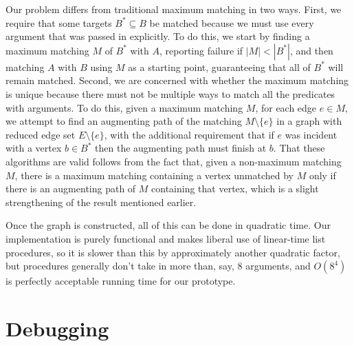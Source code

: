 \documentclass[11pt]{article}
\begin{document}
Our problem differs from traditional maximum matching in two ways.
First, we require that some targets $B^* \subseteq B$ be matched
because we must use every argument that was passed in explicitly.
To do this, we start by finding a maximum matching $M$ of $B^*$ with $A$,
reporting failure if $|M| < |B^*|$,
and then matching $A$ with $B$ using $M$ as a starting point,
guaranteeing that all of $B^*$ will remain matched.
Second, we are concerned with whether the maximum matching is unique
because there must not be multiple ways
to match all the predicates with arguments.
To do this, given a maximum matching $M$,
for each edge $e \in M$,
we attempt to find an augmenting path of the matching $M \setminus \{e\}$
in a graph with reduced edge set $E \setminus \{e\}$,
with the additional requirement that
if $e$ was incident with a vertex $b \in B^*$
then the augmenting path must finish at $b$.
That these algorithms are valid follows from the fact that,
given a non-maximum matching $M$,
there is a maximum matching containing a vertex unmatched by $M$
only if there is an augmenting path of $M$ containing that vertex,
which is a slight strengthening of the result mentioned earlier.

Once the graph is constructed, all of this can be done in quadratic time.
Our implementation is purely functional
and makes liberal use of linear-time list procedures,
so it is slower than this by approximately another quadratic factor,
but procedures generally don't take in more than, say, 8 arguments,
and $O(8^4)$ is perfectly acceptable running time for our prototype.


\section{Debugging}\label{debugging}
\end{document}
